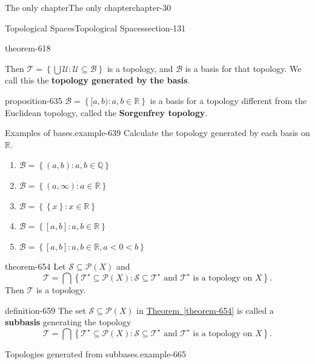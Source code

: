 \documentclass[oneside,10pt,]{book}
\newcommand{\terminology}[1]{\textbf{#1}}
\newcommand{\mb}{\mathbb}
\newcommand{\mc}{\mathcal}
\newcommand{\setBuilder}[2]{\left\{#1:#2\right\}}
\newcommand{\setList}[1]{\left\{#1\right\}}
\newcommand{\lt}{<}
\begin{document}
\begin{chapterptx}{The only chapter}{}{The only chapter}{}{}{chapter-30}
\begin{sectionptx}{Topological Spaces}{}{Topological Spaces}{}{}{section-131}
\begin{theorem}{}{}{theorem-618}
\begin{enumerate}
\end{enumerate}
\hypertarget{p-631}{}%
Then \(\mc T=\setBuilder{\bigcup\mc U}{\mc U\subseteq\mc B}\) is a topology, and \(\mc B\) is a basis for that topology. We call this the \terminology{topology generated by the basis}.%
\end{theorem}
\begin{proposition}{}{}{proposition-635}%
\hypertarget{p-636}{}%
\(\mc B=\setBuilder{[a,b)}{a,b\in\mb R}\) is a basis for a topology different from the Euclidean topology, called the \terminology{Sorgenfrey topology}.%
\end{proposition}
\begin{example}{Examples of bases.}{example-639}%
\hypertarget{p-641}{}%
Calculate the topology generated by each basis on \(\mb R\).%
\leavevmode%
\begin{enumerate}
\item\hypertarget{li-644}{}\(\mc B=\setBuilder{(a,b)}{a,b\in\mb Q}\)%
\item\hypertarget{li-646}{}\(\mc B=\setBuilder{(a,\infty)}{a\in\mb R}\)%
\item\hypertarget{li-648}{}\(\mc B=\setBuilder{\setList{x}}{x\in\mb R}\)%
\item\hypertarget{li-650}{}\(\mc B=\setBuilder{[a,b]}{a,b\in\mb R}\)%
\item\hypertarget{li-652}{}\(\mc B=\setBuilder{[a,b]}{a,b\in\mb R,a\lt0\lt b}\)%
\end{enumerate}
\end{example}
\begin{theorem}{}{}{theorem-654}%
\hypertarget{p-655}{}%
Let \(\mc S\subseteq\mc P(X)\) and%
\begin{equation*}
\mc T=\bigcap\setBuilder{\mc T^\star\subseteq\mc P(X)}{\mc S\subseteq\mc T^\star \text{ and }
\mc T^\star \text{ is a topology on } X}.
\end{equation*}
Then \(\mc T\) is a topology.%
\end{theorem}
\begin{definition}{}{definition-659}%
\hypertarget{p-660}{}%
The set \(\mc S\subseteq\mc P(X)\) in \hyperref[theorem-654]{Theorem~\ref{theorem-654}} is called a \terminology{subbasis} generating the topology%
\begin{equation*}
\mc T=\bigcap\setBuilder{\mc T^\star\subseteq\mc P(X)}{\mc S\subseteq\mc T^\star \text{ and }
\mc T^\star \text{ is a topology on } X}.
\end{equation*}
%
\end{definition}
\begin{example}{Topologies generated from subbases.}{example-665}%

\end{example}
\end{sectionptx}
\end{chapterptx}
\end{document}
